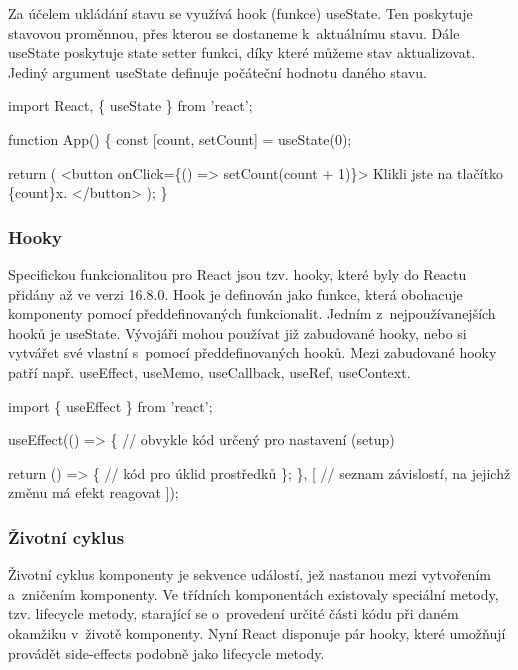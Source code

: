 Za účelem ukládání stavu se využívá hook (funkce) useState. Ten poskytuje stavovou proměnnou, přes kterou se dostaneme k~aktuálnímu stavu. 
Dále useState poskytuje state setter funkci, díky které můžeme stav aktualizovat. Jediný argument useState definuje počáteční hodnotu daného stavu.\cite{reactitnetwork,react}

\begin{prog}
import React, \{ useState \} from 'react';

function App() \{
  const [count, setCount] = useState(0);

  return (
    <button onClick=\{() => setCount(count + 1)\}>
      Klikli jste na tlačítko \{count\}x.
    </button>
  );
\}
\end{prog}

\subsubsection{Hooky}

Specifickou funkcionalitou pro React jsou tzv. hooky, které byly do Reactu přidány až ve verzi 16.8.0.\cite{reactgithub} 
Hook je definován jako funkce, která obohacuje komponenty pomocí předdefinovaných funkcionalit. Jedním z~nejpoužívanejších hooků je useState. 
Vývojáři mohou používat již zabudované hooky, nebo si vytvářet své vlastní s~pomocí předdefinovaných hooků. 
Mezi zabudované hooky patří např. useEffect, useMemo, useCallback, useRef, useContext.\cite{react}

\begin{prog}
import \{ useEffect \} from 'react';

useEffect(() => \{
  // obvykle kód určený pro nastavení (setup)

  return () => \{
    // kód pro úklid prostředků
  \};
\}, [
  // seznam závislostí, na jejichž změnu má efekt reagovat
]);
\end{prog}

\subsubsection{Životní cyklus}

Životní cyklus komponenty je sekvence událostí, jež nastanou mezi vytvořením a~zničením komponenty. 
Ve třídních komponentách existovaly speciální metody, tzv. lifecycle metody, starající se o~provedení určité části kódu při daném okamžiku v~životě komponenty. 
Nyní React disponuje pár hooky, které umožňují provádět side-effects podobně jako lifecycle metody.

